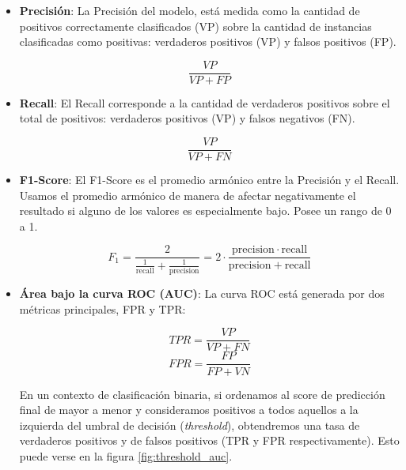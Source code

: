 \begin{itemize}

    \item \textbf{Precisión}: La Precisión del modelo, está medida como la cantidad de positivos correctamente clasificados (VP) sobre la cantidad de instancias clasificadas como positivas: verdaderos positivos (VP) y falsos positivos (FP).
    
    \begin{equation*}
        \frac{VP}{VP + FP}
    \end{equation*}
    
    \item \textbf{Recall}: El Recall corresponde a la cantidad de verdaderos positivos sobre el total de positivos: verdaderos positivos (VP) y falsos negativos (FN).
    
    \begin{equation*}
        \frac{VP}{VP + FN}
    \end{equation*}
    
    \item \textbf{F1-Score}: El F1-Score es el promedio armónico entre la Precisión y el Recall. Usamos el promedio armónico de manera de afectar negativamente el resultado si alguno de los valores es especialmente bajo. Posee un rango de 0 a 1. 
    
    \begin{equation*}
        F_1 = \frac{2}{\tfrac{1}{\mathrm{recall}} + \tfrac{1}{\mathrm{precision}}} = 2 \cdot \frac{\mathrm{precision} \cdot \mathrm{recall}}{\mathrm{precision} + \mathrm{recall}}
    \end{equation*}
    
    
    \item \textbf{Área bajo la curva ROC (AUC)}: La curva ROC está generada por dos métricas principales, FPR y TPR:
    
    \begin{multicols}{2}
        \begin{equation*}
        TPR = \frac{VP}{VP + FN}
        \end{equation*}
        \break
        \begin{equation*}
        FPR = \frac{FP}{FP + VN} 
        \end{equation*}
    \end{multicols}
    
    En un contexto de clasificación binaria, si ordenamos al score de predicción final de mayor a menor y consideramos positivos a todos aquellos a la izquierda del umbral de decisión (\textit{threshold}), obtendremos una tasa de verdaderos positivos y de falsos positivos (TPR y FPR respectivamente). Esto puede verse en la figura \ref{fig:threshold_auc}.
    

\end{itemize}
